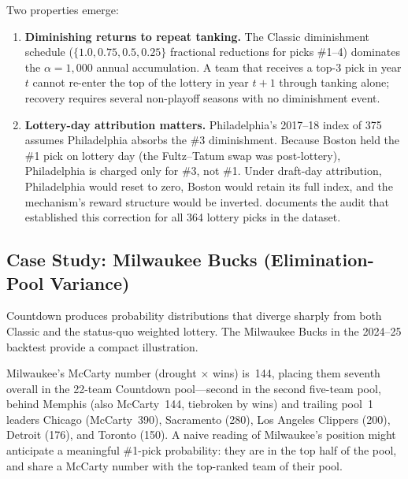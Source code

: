 Two properties emerge:

\begin{enumerate}
    \item \textbf{Diminishing returns to repeat tanking.} The Classic \cola{} diminishment schedule ($\{1.0, 0.75, 0.5, 0.25\}$ fractional reductions for picks \#1--4) dominates the $\alpha = 1{,}000$ annual accumulation. A team that receives a top-3 pick in year $t$ cannot re-enter the top of the lottery in year $t+1$ through tanking alone; recovery requires several non-playoff seasons with no diminishment event.
    \item \textbf{Lottery-day attribution matters.} Philadelphia's 2017--18 index of 375 assumes Philadelphia absorbs the \#3 diminishment. Because Boston held the \#1 pick on lottery day (the Fultz--Tatum swap was post-lottery), Philadelphia is charged only for \#3, not \#1. Under draft-day attribution, Philadelphia would reset to zero, Boston would retain its full index, and the mechanism's reward structure would be inverted.  documents the audit that established this correction for all 364 lottery picks in the dataset.
\end{enumerate}

\subsection{Case Study: Milwaukee Bucks (Elimination-Pool Variance)}
\label{sec:case-mil}

Countdown \cola{} produces probability distributions that diverge sharply from both Classic \cola{} and the status-quo weighted lottery. The Milwaukee Bucks in the 2024--25 backtest provide a compact illustration.

Milwaukee's McCarty number (drought $\times$ wins) is~144, placing them seventh overall in the 22-team Countdown pool---second in the second five-team pool, behind Memphis (also McCarty~144, tiebroken by wins) and trailing pool~1 leaders Chicago (McCarty~390), Sacramento (280), Los Angeles Clippers (200), Detroit (176), and Toronto (150). A naive reading of Milwaukee's position might anticipate a meaningful \#1-pick probability: they are in the top half of the pool, and share a McCarty number with the top-ranked team of their pool.

